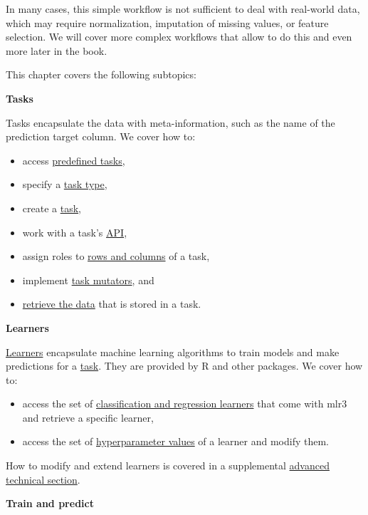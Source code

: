 \documentclass[]{scrbook}
\providecommand{\tightlist}{%
  \setlength{\itemsep}{0pt}\setlength{\parskip}{0pt}}
\begin{document}
In many cases, this simple workflow is not sufficient to deal with real-world data, which may require normalization, imputation of missing values, or feature selection.
We will cover more complex workflows that allow to do this and even more later in the book.

This chapter covers the following subtopics:

\textbf{Tasks}

Tasks encapsulate the data with meta-information, such as the name of the prediction target column.
We cover how to:

\begin{itemize}
\tightlist
\item
  access \protect\hyperlink{tasks-predefined}{predefined tasks},
\item
  specify a \protect\hyperlink{tasks-types}{task type},
\item
  create a \protect\hyperlink{tasks-creation}{task},
\item
  work with a task's \protect\hyperlink{tasks-api}{API},
\item
  assign roles to \protect\hyperlink{tasks-roles}{rows and columns} of a task,
\item
  implement \protect\hyperlink{tasks-mutators}{task mutators}, and
\item
  \protect\hyperlink{tasks-retrieved}{retrieve the data} that is stored in a task.
\end{itemize}

\textbf{Learners}

\protect\hyperlink{learners}{Learners} encapsulate machine learning algorithms to train models and make predictions for a \protect\hyperlink{tasks}{task}.
They are provided by R and other packages.
We cover how to:

\begin{itemize}
\tightlist
\item
  access the set of \protect\hyperlink{learners-predefined}{classification and regression learners} that come with mlr3 and retrieve a specific learner,
\item
  access the set of \protect\hyperlink{learners-predefined}{hyperparameter values} of a learner and modify them.
\end{itemize}

How to modify and extend learners is covered in a supplemental \protect\hyperlink{extending-learners}{advanced technical section}.

\textbf{Train and predict}
\end{document}
